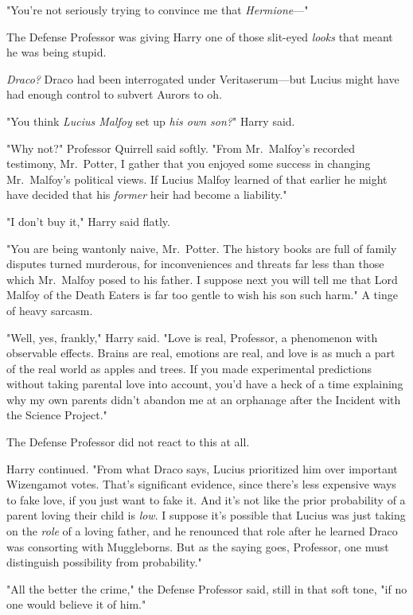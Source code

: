 "You're not seriously trying to convince me that \emph{Hermione}---"

The Defense Professor was giving Harry one of those slit-eyed \emph{looks} that
meant he was being stupid.

\emph{Draco?} Draco had been interrogated under Veritaserum---but Lucius might
have had enough control to subvert Aurors to{\el} oh.

"You think \emph{Lucius Malfoy} set up \emph{his own son?}" Harry said.

"Why not?" Professor Quirrell said softly. "From Mr.~Malfoy's recorded
testimony, Mr.~Potter, I gather that you enjoyed some success in changing
Mr.~Malfoy's political views. If Lucius Malfoy learned of that earlier{\el}
he might have decided that his \emph{former} heir had become a liability."

"I don't buy it," Harry said flatly.

"You are being wantonly naive, Mr.~Potter. The history books are full of family
disputes turned murderous, for inconveniences and threats far less than those
which Mr.~Malfoy posed to his father. I suppose next you will tell me that Lord
Malfoy of the Death Eaters is far too gentle to wish his son such harm." A
tinge of heavy sarcasm.

"Well, yes, frankly," Harry said. "Love is real, Professor, a phenomenon with
observable effects. Brains are real, emotions are real, and love is as much a
part of the real world as apples and trees. If you made experimental
predictions without taking parental love into account, you'd have a heck of a
time explaining why my own parents didn't abandon me at an orphanage after the
Incident with the Science Project."

The Defense Professor did not react to this at all.

Harry continued. "From what Draco says, Lucius prioritized him over important
Wizengamot votes. That's significant evidence, since there's less expensive
ways to fake love, if you just want to fake it. And it's not like the prior
probability of a parent loving their child is \emph{low}. I suppose it's
possible that Lucius was just taking on the \emph{role} of a loving father, and
he renounced that role after he learned Draco was consorting with Muggleborns.
But as the saying goes, Professor, one must distinguish possibility from
probability."

"All the better the crime," the Defense Professor said, still in that soft
tone, "if no one would believe it of him."

